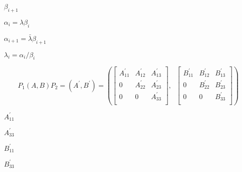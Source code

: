 {\newpage\clearpage
{}%
$\beta_{i+1}$%
\lthtmlinlinemathZ
\lthtmlcheckvsize\clearpage}

{\newpage\clearpage
{}%
$\alpha_i = \lambda \beta_i$%
\lthtmlinlinemathZ
\lthtmlcheckvsize\clearpage}

{\newpage\clearpage
{}%
$\alpha_{i+1}=\bar{\lambda}\beta_{i+1}$%
\lthtmlinlinemathZ
\lthtmlcheckvsize\clearpage}

{\newpage\clearpage
{}%
$\lambda_i = \alpha_i / \beta_i$%
\lthtmlinlinemathZ
\lthtmlcheckvsize\clearpage}

{\newpage\clearpage
{}%
\begin{displaymath} P_1(A,B)P_2 = (A^\prime,B^\prime) = \left(
        \left[
        \begin{array}{ccc}
          A^\prime_{11} & A^\prime_{12} & A^\prime_{13} \\
          0             & A^\prime_{22} & A^\prime_{23} \\
          0             &      0        & A^\prime_{33} \\
        \end{array}\right],\;\;
        \left[
        \begin{array}{ccc}
          B^\prime_{11} & B^\prime_{12} & B^\prime_{13} \\
          0             & B^\prime_{22} & B^\prime_{23} \\
          0             &      0        & B^\prime_{33} \\
        \end{array}  \right]
        \right)
      \end{displaymath}%
\lthtmldisplayZ
\lthtmlcheckvsize\clearpage}

{\newpage\clearpage
{}%
$A^\prime_{11}$%
\lthtmlinlinemathZ
\lthtmlcheckvsize\clearpage}

{\newpage\clearpage
{}%
$A^\prime_{33}$%
\lthtmlinlinemathZ
\lthtmlcheckvsize\clearpage}

{\newpage\clearpage
{}%
$B^\prime_{11}$%
\lthtmlinlinemathZ
\lthtmlcheckvsize\clearpage}

{\newpage\clearpage
{}%
$B^\prime_{33}$%
\lthtmlinlinemathZ
\lthtmlcheckvsize\clearpage}

